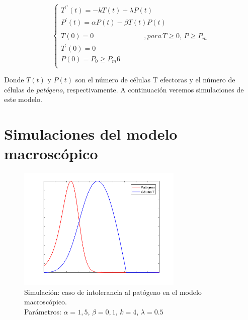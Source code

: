 \begin{equation}
	\label{sist_macro}
	\left\{ \begin{array}{l}
	{T^{\prime\prime}}(t) = -kT(t) + \lambda P(t) \\
	{P^{\prime}}(t) = \alpha P(t) - \beta T(t)P(t) \\
	\\
	T(0)=0 \hspace{3cm} ,para\, T \geq 0,\, P \geq P_m \\
	T^{\prime}(0)=0  \\
	P(0)=P_0 \geq P_m 6 \\ 
	\end{array}
	\right.
\end{equation}

Donde $T(t)$ y $P(t)$ son el número de células T efectoras y el número de células de \textit{patógeno}, respectivamente. A continuación veremos simulaciones de este modelo.

\section{Simulaciones del modelo macroscópico}


\begin{figure}[t]
	\centering
	\includegraphics[width=0.7\textwidth]{Imagenes/Simulaciones/macro_intoler}
	\caption{Simulación: caso de intolerancia al patógeno en el modelo macroscópico.\\Parámetros: $\alpha=1,5$, $\beta=0,1$, $k=4$, $\lambda=0.5$}
	\label{fig:macro_intolerance}
\end{figure}

